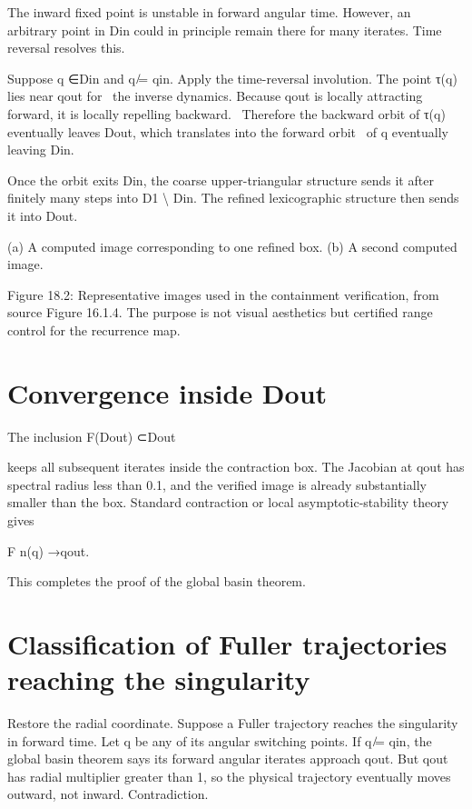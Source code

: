 The inward fixed point is unstable in forward angular time. However, an arbitrary point in Din could in principle remain there for many iterates. Time reversal resolves this.


\begin{displaytext}
Suppose q ∈Din and q ̸= qin. Apply the time-reversal involution. The point τ(q) lies near qout for \
the inverse dynamics. Because qout is locally attracting forward, it is locally repelling backward. \
Therefore the backward orbit of τ(q) eventually leaves Dout, which translates into the forward orbit \
of q eventually leaving Din.
\end{displaytext}

Once the orbit exits Din, the coarse upper-triangular structure sends it after finitely many steps into D1 \textbackslash{} Din. The refined lexicographic structure then sends it into Dout.


(a) A computed image corresponding to one refined box. (b) A second computed image.


\begin{figureplaceholder}
Figure 18.2: Representative images used in the containment verification, from source Figure 16.1.4. The purpose is not visual aesthetics but certified range control for the recurrence map.
\end{figureplaceholder}

\section{Convergence inside Dout}

The inclusion F(Dout) ⊂Dout


keeps all subsequent iterates inside the contraction box. The Jacobian at qout has spectral radius less than 0.1, and the verified image is already substantially smaller than the box. Standard contraction or local asymptotic-stability theory gives


F n(q) →qout.


This completes the proof of the global basin theorem.


\section{Classification of Fuller trajectories reaching the singularity}

Restore the radial coordinate. Suppose a Fuller trajectory reaches the singularity in forward time. Let q be any of its angular switching points. If q ̸= qin, the global basin theorem says its forward angular iterates approach qout. But qout has radial multiplier greater than 1, so the physical trajectory eventually moves outward, not inward. Contradiction.


